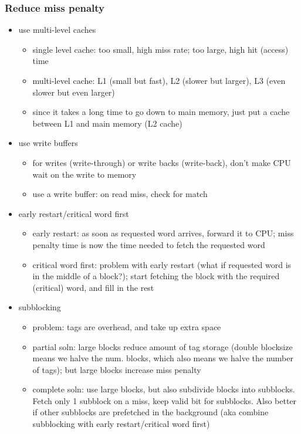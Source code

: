 \documentclass[12pt]{extarticle}
\begin{document}
	\subsubsection{Reduce miss penalty}

	\begin{itemize}
		\item use multi-level caches
		\begin{itemize}
			\item single level cache: too small, high miss rate; too large, high hit (access) time
			\item multi-level cache: L1 (small but fast), L2 (slower but larger), L3 (even slower but even larger)
			\item since it takes a long time to go down to main memory, just put a cache between L1 and main memory (L2 cache)
		\end{itemize}

		\item use write buffers
		\begin{itemize}
			\item for writes (write-through) or write backs (write-back), don't make CPU wait on the write to memory
			\item use a write buffer: on read miss, check for match
		\end{itemize}

		\item early restart/critical word first
		\begin{itemize}
			\item early restart: as soon as requested word arrives, forward it to CPU; miss penalty time is now the time 
			needed to fetch the requested word
			\item critical word first: problem with early restart (what if requested word is in the middle of a block?); 
			start fetching the block with the required (critical) word, and fill in the rest
		\end{itemize}

		\item subblocking
		\begin{itemize}
			\item problem: tags are overhead, and take up extra space
			\item partial soln: large blocks reduce amount of tag storage (double blocksize means we halve the num. blocks, 
			which also means we halve the number of tags); but large blocks increase miss penalty
			\item complete soln: use large blocks, but also subdivide blocks into subblocks. Fetch only 1 subblock on a miss, 
			keep valid bit for subblocks. Also better if other subblocks are prefetched in the background (aka combine 
			subblocking with early restart/critical word first)
		\end{itemize}
	\end{itemize}
\end{document}
